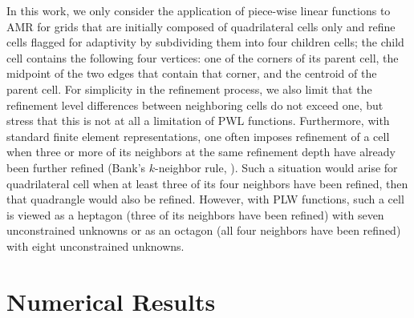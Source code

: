 \documentclass[preprint,10pt]{elsarticle}
\begin{document}
In this work, we only consider the application of piece-wise linear functions to AMR for 
grids that are initially composed of quadrilateral cells only and refine cells flagged for adaptivity 
by subdividing them into four children cells; the child cell contains the following four vertices: 
one of the corners of its parent cell, the midpoint of the two edges that contain that corner, 
and the centroid of the parent cell.
For simplicity in the refinement process, we also limit that the refinement level differences between 
neighboring cells do not exceed one, but stress that this is not at all a limitation of PWL functions.
Furthermore, with standard finite element representations, one often imposes refinement of a cell 
when three or more of its neighbors at the same refinement depth have already been 
further refined (Bank's $k$-neighbor rule, \cite{banks}). Such a situation would arise for 
quadrilateral cell when at least three of its four neighbors have been refined,
then that quadrangle would also be refined. However, with PLW functions, such a cell is viewed as a
heptagon (three of its neighbors have been refined) with seven unconstrained unknowns or as an 
octagon (all four neighbors have been refined) with eight unconstrained unknowns.



 
\section{Numerical Results} \label{sec:results}
\end{document}
